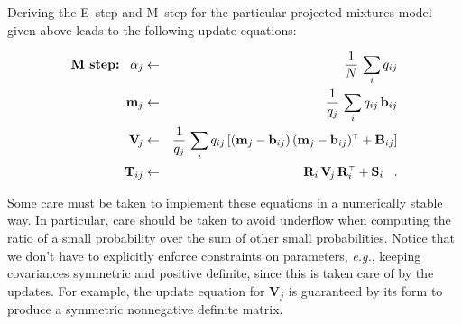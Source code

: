 \documentclass[12pt,preprint]{aastex}
\newcommand{\latin}[1]{\textit{#1}}
\newcommand{\eg}{\latin{e.g.}}
\renewcommand{\vec}[1]{\mathbf{#1}} %
\newcommand{\bb}{\vec{b}}
\newcommand{\mm}{\vec{m}}
\newcommand{\bij}{\bb_{ij}}
\newcommand{\mmj}{\mm_j}
\newcommand{\ten}[1]{\mathbf{#1}} %
\newcommand{\BB}{\ten{B}}
\newcommand{\RR}{\ten{R}}
\renewcommand{\SS}{\ten{S}}
\newcommand{\TT}{\ten{T}}
\newcommand{\VV}{\ten{V}}
\newcommand{\BBij}{\BB_{ij}}
\newcommand{\RRi}{\RR_i}
\newcommand{\SSi}{\SS_i}
\newcommand{\VVj}{\VV_{\!j}} %
\newcommand{\TTij}{\TT_{ij}}
\newcommand{\T}{^{\scriptscriptstyle \top}}   %
\newcommand{\alphaj}{\alpha_j}
\newcommand{\qij}{q_{ij}}
\newcommand{\qqj}{q_j}
\begin{document}
Deriving the E~step and M~step for the particular projected mixtures
model given above leads to the following update equations:

\begin{eqnarray}\displaystyle
\mbox{\textbf{M~step:}}\;\;\;
\alphaj &\leftarrow& \frac{1}{N}\,\sum_i \qij\nonumber \\
   \mmj &\leftarrow& \frac{1}{\qqj}\,\sum_i \qij\,\bij\nonumber \\
   \VVj &\leftarrow& \frac{1}{\qqj}\,\sum_i \qij
                     \left[(\mmj-\bij)\,(\mmj-\bij)\T+\BBij\right]\nonumber \\
  \TTij &\leftarrow& \RRi\,\VVj\,\RRi\T+\SSi \;\;\;.
\end{eqnarray}

Some care must be taken to implement these equations in a numerically
stable way. In particular, care should be taken to avoid underflow
when computing the ratio of a small probability over the sum of other
small probabilities. Notice that we don't have to explicitly enforce
constraints on parameters, \eg, keeping covariances symmetric and
positive definite, since this is taken care of by the updates.  For
example, the update equation for $\VVj$ is guaranteed by its form to
produce a symmetric nonnegative definite matrix.
\end{document}
